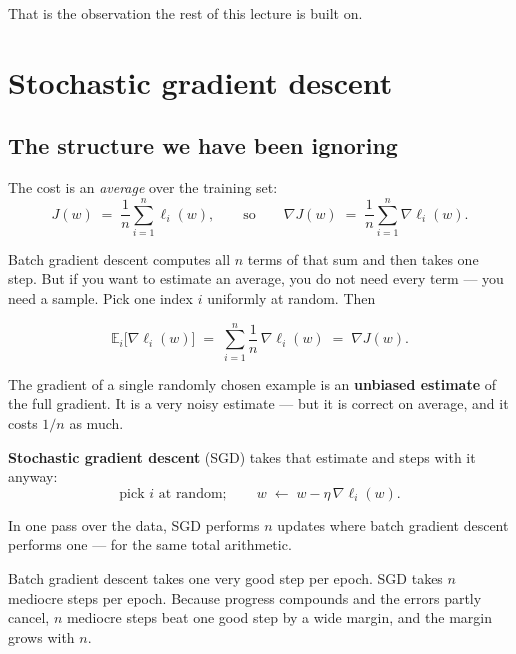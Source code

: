 \documentclass[11pt]{article}
\begin{document}
That is the observation the rest of this lecture is built on.

\section{Stochastic gradient descent}
\label{sec:sgd}

\subsection{The structure we have been ignoring}

The cost is an \emph{average} over the training set:
\[
  J(w) \;=\; \frac{1}{n}\sum_{i=1}^{n} \ell_i(w),
  \qquad\text{so}\qquad
  \nabla J(w) \;=\; \frac{1}{n}\sum_{i=1}^{n} \nabla \ell_i(w) .
\]

Batch gradient descent computes all $n$ terms of that sum and then takes one
step. But if you want to estimate an average, you do not need every term ---
you need a sample. Pick one index $i$ uniformly at random. Then

\begin{equation}
  \label{eq:unbiased}
  \mathbb{E}_i\big[\nabla \ell_i(w)\big]
  \;=\; \sum_{i=1}^{n} \frac{1}{n}\, \nabla \ell_i(w)
  \;=\; \nabla J(w).
\end{equation}

The gradient of a single randomly chosen example is an \textbf{unbiased
estimate} of the full gradient. It is a very noisy estimate --- but it is
correct on average, and it costs $1/n$ as much.

\textbf{Stochastic gradient descent} (SGD) takes that estimate and steps with
it anyway:
\begin{equation}
  \label{eq:sgd}
  \text{pick } i \text{ at random}; \qquad
  w \;\leftarrow\; w - \eta\, \nabla \ell_i(w).
\end{equation}

In one pass over the data, SGD performs $n$ updates where batch gradient
descent performs one --- for the same total arithmetic.

\begin{keyidea}
Batch gradient descent takes one very good step per epoch. SGD takes $n$
mediocre steps per epoch. Because progress compounds and the errors partly
cancel, $n$ mediocre steps beat one good step by a wide margin, and the margin
grows with $n$.
\end{keyidea}
\end{document}
